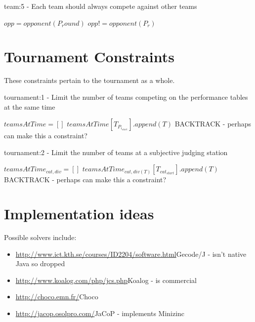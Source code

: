 \documentclass[letterpaper,11pt]{report}
\begin{document}
\begin{algorithm}
\caption{team:5 - Each team should always compete against other teams}
\begin{algorithmic}
  \STATE $opp = opponent(P_round)$
    \STATE $opp != opponent(P_r)$
  \ENDFOR
\ENDFOR
\end{algorithmic}
\end{algorithm}


\FloatBarrier
\section{Tournament Constraints}
These constraints pertain to the tournament as a whole.

\begin{algorithm}
\caption{tournament:1 - Limit the number of teams competing on the performance tables at
  the same time}
\begin{algorithmic}

\STATE $teamsAtTime = []$
    \STATE $teamsAtTime[T_{P_{i_{start}}}].append(T)$
  \ENDFOR
      \STATE BACKTRACK - perhaps can make this a constraint?
    \ENDIF
  \ENDFOR
\ENDFOR

\end{algorithmic}
\end{algorithm}

\begin{algorithm}
\caption{tournament:2 - Limit the number of teams at a subjective judging station}
\begin{algorithmic}
    \STATE $teamsAtTime_{cat,div} = []$
  \ENDFOR
    \STATE $teamsAtTime_{cat,div(T)}[T_{cat_{start}}].append(T)$
  \ENDFOR
        \STATE BACKTRACK - perhaps can make this a constraint?
      \ENDIF
    \ENDFOR
  \ENDFOR
\ENDFOR
\end{algorithmic}
\end{algorithm}

\FloatBarrier
\section{Implementation ideas}
Possible solvers include:
\begin{itemize}
\item \url{http://www.ict.kth.se/courses/ID2204/software.html}{Gecode/J} - isn't native Java so dropped
\item \url{http://www.koalog.com/php/jcs.php}{Koalog} - is commercial
\item \url{http://choco.emn.fr/}{Choco}
\item \url{http://jacop.osolpro.com/}{JaCoP} - implements Minizinc
\end{itemize}
\end{document}
